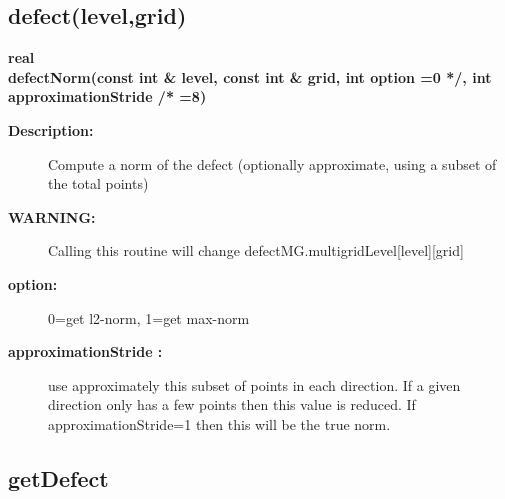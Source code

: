 \subsection{defect(level,grid)}
 
\begin{flushleft} \textbf{%
real  \\ 
\settowidth{\OgmgIncludeArgIndent}{defectNorm(}%
defectNorm(const int \& level, const int \& grid, int option  =0 */, int approximationStride /* =8)
}\end{flushleft}
\begin{description}
\item[{\bf Description:}] 
    Compute a norm of the defect (optionally approximate, using a subset of the total points)

\item[{\bf WARNING:}]  Calling this routine will change defectMG.multigridLevel[level][grid]

\item[{\bf option:}]  0=get l2-norm, 1=get max-norm
\item[{\bf approximationStride :}]  use approximately this subset of points in each direction. If a given
    direction only has a few points then this value is reduced. If approximationStride=1 then
    this will be the true norm.

\end{description}
\subsection{getDefect}
 
